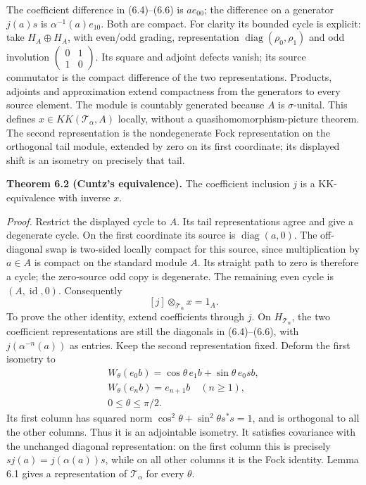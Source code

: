 \documentclass[
  11pt,
]{article}
\begin{document}
The coefficient difference in (6.4)--(6.6) is \(a e_{00}\); the
difference on a generator \(j(a)s\) is \(\alpha^{-1}(a)e_{10}\). Both
are compact. For clarity its bounded cycle is explicit: take
\(H_A\oplus H_A\), with even/odd grading, representation
\(\operatorname{diag}(\rho_0,\rho_1)\) and odd involution
\(\left(\begin{smallmatrix}0&1\\1&0\end{smallmatrix}\right)\). Its
square and adjoint defects vanish; its source commutator is the compact
difference of the two representations. Products, adjoints and
approximation extend compactness from the generators to every source
element. The module is countably generated because \(A\) is
\(\sigma\)-unital. This defines \(x\in KK(\mathcal T_\alpha,A)\)
locally, without a quasihomomorphism-picture theorem. The second
representation is the nondegenerate Fock representation on the
orthogonal tail module, extended by zero on its first coordinate; its
displayed shift is an isometry on precisely that tail.

\textbf{Theorem 6.2 (Cuntz's equivalence).} The coefficient inclusion
\(j\) is a KK-equivalence with inverse \(x\).

\emph{Proof.} Restrict the displayed cycle to \(A\). Its tail
representations agree and give a degenerate cycle. On the first
coordinate its source is \(\operatorname{diag}(a,0)\). The off-diagonal
swap is two-sided locally compact for this source, since multiplication
by \(a\in A\) is compact on the standard module \(A\). Its straight path
to zero is therefore a cycle; the zero-source odd copy is degenerate.
The remaining even cycle is \((A,\operatorname{id},0)\). Consequently \[
[j]\otimes_{\mathcal T_\alpha}x=1_A.
\tag{6.7}
\] To prove the other identity, extend coefficients through \(j\). On
\(H_{\mathcal T_\alpha}\), the two coefficient representations are still
the diagonals in (6.4)--(6.6), with \(j(\alpha^{-n}(a))\) as entries.
Keep the second representation fixed. Deform the first isometry to \[
\begin{gathered}
W_\theta(e_0b)=\cos\theta\,e_1b+
\sin\theta\,e_0s b,\\
W_\theta(e_nb)=e_{n+1}b\quad(n\ge1),\\
0\le\theta\le\pi/2.
\end{gathered}
\tag{6.8}
\] Its first column has squared norm
\(\cos^2\theta+\sin^2\theta s^*s=1\), and is orthogonal to all the other
columns. Thus it is an adjointable isometry. It satisfies covariance
with the unchanged diagonal representation: on the first column this is
precisely \(sj(a)=j(\alpha(a))s\), while on all other columns it is the
Fock identity. Lemma 6.1 gives a representation of \(\mathcal T_\alpha\)
for every \(\theta\).
\end{document}

